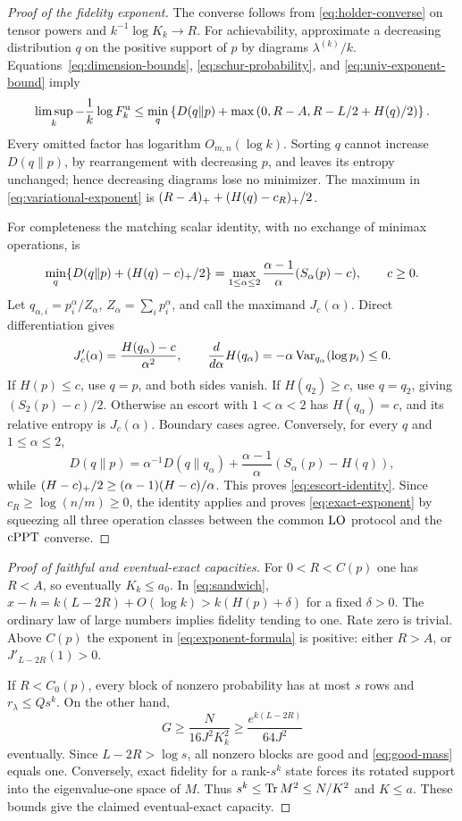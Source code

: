 \begin{proof}[Proof of the fidelity exponent]
The converse follows from \eqref{eq:holder-converse} on tensor powers and $k^{-1}\log K_k\to R$. For achievability, approximate a decreasing distribution $q$ on the positive support of $p$ by diagrams $\lambda^{(k)}/k$. Equations~\eqref{eq:dimension-bounds}, \eqref{eq:schur-probability}, and \eqref{eq:univ-exponent-bound} imply
\begin{equation}\label{eq:variational-exponent}
 \limsup_k-\frac1k\log F_k^{\rm u}
 \le\min_q\left\{D(q\|p)+\max\left(0,R-A,R-L/2+H(q)/2\right)\right\}.
\end{equation}
Every omitted factor has logarithm $O_{m,n}(\log k)$. Sorting $q$ cannot increase $D(q\|p)$, by rearrangement with decreasing $p$, and leaves its entropy unchanged; hence decreasing diagrams lose no minimizer. The maximum in \eqref{eq:variational-exponent} is $(R-A)_++(H(q)-c_R)_+/2$.

For completeness the matching scalar identity, with no exchange of minimax operations, is
\begin{equation}\label{eq:escort-identity}
 \min_q\{D(q\|p)+(H(q)-c)_+/2\}
 =\max_{1\le\alpha\le2}\frac{\alpha-1}{\alpha}(S_\alpha(p)-c),\qquad c\ge0.
\end{equation}
Let $q_{\alpha,i}=p_i^\alpha/Z_\alpha$, $Z_\alpha=\sum_i p_i^\alpha$, and call the maximand $J_c(\alpha)$. Direct differentiation gives
\[
 J'_c(\alpha)=\frac{H(q_\alpha)-c}{\alpha^2},\qquad
 \frac{d}{d\alpha}H(q_\alpha)=-\alpha\operatorname{Var}_{q_\alpha}(\log p_i)\le0.
\]
If $H(p)\le c$, use $q=p$, and both sides vanish. If $H(q_2)\ge c$, use $q=q_2$, giving $(S_2(p)-c)/2$. Otherwise an escort with $1<\alpha<2$ has $H(q_\alpha)=c$, and its relative entropy is $J_c(\alpha)$. Boundary cases agree. Conversely, for every $q$ and $1\le\alpha\le2$,
\[
 D(q\|p)=\alpha^{-1}D(q\|q_\alpha)
 +\frac{\alpha-1}{\alpha}(S_\alpha(p)-H(q)),
\]
while $(H-c)_+/2\ge(\alpha-1)(H-c)/\alpha$. This proves \eqref{eq:escort-identity}. Since $c_R\ge\log(n/m)\ge0$, the identity applies and proves \eqref{eq:exact-exponent} by squeezing all three operation classes between the common $\mathrm{LO}$ protocol and the $\mathrm{cPPT}$ converse.
\end{proof}

\begin{proof}[Proof of faithful and eventual-exact capacities]
For $0<R<C(p)$ one has $R<A$, so eventually $K_k\le a_0$. In \eqref{eq:sandwich},
$x-h=k(L-2R)+O(\log k)>k(H(p)+\delta)$ for a fixed $\delta>0$. The ordinary law of large numbers implies fidelity tending to one. Rate zero is trivial. Above $C(p)$ the exponent in \eqref{eq:exponent-formula} is positive: either $R>A$, or $J'_{L-2R}(1)>0$.

If $R<C_0(p)$, every block of nonzero probability has at most $s$ rows and $r_\lambda\le Qs^k$. On the other hand,
\[
 G\ge\frac{N}{16J^2K_k^2}\ge\frac{e^{k(L-2R)}}{64J^2}
\]
eventually. Since $L-2R>\log s$, all nonzero blocks are good and \eqref{eq:good-mass} equals one. Conversely, exact fidelity for a rank-$s^k$ state forces its rotated support into the eigenvalue-one space of $M$. Thus $s^k\le\operatorname{Tr} M^2\le N/K^2$ and $K\le a$. These bounds give the claimed eventual-exact capacity.
\end{proof}

